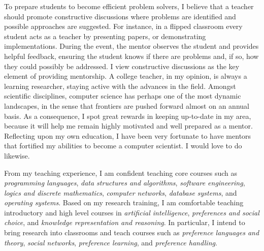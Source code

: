 \documentclass[12pt]{article}
\newcommand{\tit}[1]{\textit{#1}}
\begin{document}
To prepare students to become efficient problem solvers, 
I believe that a teacher should promote
constructive discussions where problems are identified and possible approaches are suggested.
For instance, in a flipped classroom every student acts as a teacher by presenting papers,
or demonstrating implementations.  During the event, the mentor observes the student and
provides helpful feedback, ensuring the student knows if there are problems and, if so,
how they could possibly be addressed.
I view constructive discussions as the key element of providing mentorship.
A college teacher, in my opinion, is always a learning researcher, staying
active with the advances in the field.
Amongst scientific disciplines,
computer science has perhaps one of the most dynamic landscapes, in the sense that
frontiers are pushed forward almost on an annual basis.
As a consequence, I spot great rewards in keeping up-to-date in my area,
because it will help me remain highly motivated and well prepared as a mentor.
Reflecting upon my own education, I have been very fortunate to have mentors
that fortified my abilities to become a computer scientist.
I would love to do likewise.

From my teaching experience, I am confident teaching core courses such as
\tit{programming languages}, \tit{data structures and algorithms}, \tit{software engineering},
\tit{logics and discrete mathematics},
\tit{computer networks}, \tit{database systems}, and \tit{operating systems}.
Based on my research training, I am comfortable teaching introductory and high 
level courses in \tit{artificial intelligence},
\tit{preferences and social choice}, and \tit{knowledge representation and reasoning}.
In particular, I intend to bring research into classrooms and teach courses such as
\tit{preference languages and theory}, \tit{social networks},
\tit{preference learning}, and \tit{preference handling}.
\end{document}
